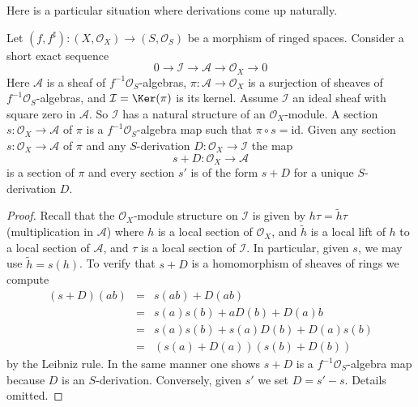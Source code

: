 \noindent
Here is a particular situation where derivations come up
naturally.

\begin{lemma}
\label{lemma-double-structure-gives-derivation}
Let $(f, f^\sharp) : (X, \mathcal{O}_X) \to (S, \mathcal{O}_S)$
be a morphism of ringed spaces. Consider a short exact sequence
$$
0 \to \mathcal{I} \to \mathcal{A} \to \mathcal{O}_X \to 0
$$
Here $\mathcal{A}$ is a sheaf of $f^{-1}\mathcal{O}_S$-algebras,
$\pi : \mathcal{A} \to \mathcal{O}_X$ is a surjection
of sheaves of $f^{-1}\mathcal{O}_S$-algebras, and
$\mathcal{I} = \Ker(\pi)$ is its kernel. Assume $\mathcal{I}$ an ideal
sheaf with square zero in $\mathcal{A}$. So $\mathcal{I}$
has a natural structure of an $\mathcal{O}_X$-module.
A section $s : \mathcal{O}_X \to \mathcal{A}$ of $\pi$
is a $f^{-1}\mathcal{O}_S$-algebra map such that $\pi \circ s = \text{id}$.
Given any section $s : \mathcal{O}_X \to \mathcal{A}$
of $\pi$ and any $S$-derivation $D : \mathcal{O}_X \to \mathcal{I}$
the map
$$
s + D : \mathcal{O}_X \to \mathcal{A}
$$
is a section of $\pi$ and every section $s'$ is of the form $s + D$
for a unique $S$-derivation $D$.
\end{lemma}

\begin{proof}
Recall that the $\mathcal{O}_X$-module structure on $\mathcal{I}$
is given by $h \tau = \tilde h \tau$ (multiplication in $\mathcal{A}$)
where $h$ is a local section of $\mathcal{O}_X$, and
$\tilde h$ is a local lift of $h$ to a local
section of $\mathcal{A}$, and $\tau$ is a local section of $\mathcal{I}$.
In particular, given $s$, we may use $\tilde h = s(h)$.
To verify that $s + D$ is a homomorphism of sheaves of rings we
compute
\begin{eqnarray*}
(s + D)(ab) & = & s(ab) + D(ab) \\
& = & s(a)s(b) + aD(b) + D(a)b \\
& = & s(a) s(b) + s(a)D(b) + D(a)s(b) \\
& = & (s(a) + D(a))(s(b) + D(b))
\end{eqnarray*}
by the Leibniz rule. In the same manner one shows
$s + D$ is a $f^{-1}\mathcal{O}_S$-algebra
map because $D$ is an $S$-derivation. Conversely, given $s'$ we set
$D = s' - s$. Details omitted.
\end{proof}

